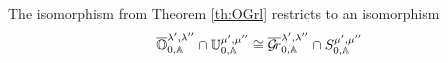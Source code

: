 \documentclass[draft]{article}
\begin{document}
\begin{theorem}
    The isomorphism from Theorem \ref{th:OGrl} restricts to an isomorphism
    $$ \overline{\mathbb O}^{\lambda', \lambda''}_{0,\mathbb A} \cap \mathbb U^{\mu', \mu''}_{0,\mathbb A} \cong \overline{\mathcal{G}\!r}^{\lambda', \lambda''}_{0,\mathbb A} \cap S^{\mu', \mu''}_{0,\mathbb A}$$
\end{theorem}

% 
% 
% 
\end{document}
